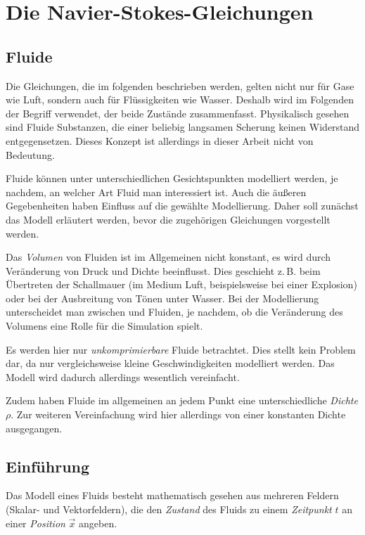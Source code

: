 \section{Die Navier-Stokes-Gleichungen}

\subsection{Fluide}

Die Gleichungen, die im folgenden beschrieben werden, gelten nicht nur für Gase
wie Luft, sondern auch für Flüssigkeiten wie Wasser. Deshalb wird im Folgenden
der Begriff  verwendet, der beide Zustände zusammenfasst.
Physikalisch gesehen sind Fluide Substanzen, die einer beliebig langsamen
Scherung keinen Widerstand entgegensetzen. Dieses Konzept ist allerdings in
dieser Arbeit nicht von Bedeutung.

Fluide können unter unterschiedlichen Gesichtspunkten modelliert werden, je
nachdem, an welcher Art Fluid man interessiert ist. Auch die äußeren
Gegebenheiten haben Einfluss auf die gewählte Modellierung. Daher soll zunächst
das Modell erläutert werden, bevor die zugehörigen Gleichungen vorgestellt
werden.

Das \emph{Volumen} von Fluiden ist im Allgemeinen nicht konstant, es wird durch
Veränderung von Druck und Dichte beeinflusst. Dies geschieht z.\,B. beim
Übertreten der Schallmauer (im Medium Luft, beispielsweise bei einer Explosion)
oder bei der Ausbreitung von Tönen unter Wasser. Bei der Modellierung
unterscheidet man zwischen  und
 Fluiden, je nachdem, ob die Veränderung des
Volumens eine Rolle für die Simulation spielt.

Es werden hier nur \emph{unkomprimierbare} Fluide betrachtet. Dies stellt kein
Problem dar, da nur vergleichsweise kleine Geschwindigkeiten modelliert werden.
Das Modell wird dadurch allerdings wesentlich vereinfacht.

Zudem haben Fluide im allgemeinen an jedem Punkt eine unterschiedliche
\emph{Dichte} $\rho$. Zur weiteren Vereinfachung wird hier allerdings von einer
konstanten Dichte ausgegangen.

\subsection{Einführung}

Das Modell eines Fluids besteht mathematisch gesehen aus mehreren Feldern
(Skalar- und Vektorfeldern), die den \emph{Zustand} des Fluids zu einem
\emph{Zeitpunkt} $t$ an einer \emph{Position} $\vec{x}$ angeben.

